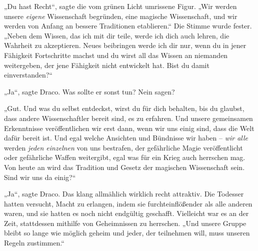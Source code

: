 „Du hast Recht“, sagte die vom grünen Licht umrissene Figur. „Wir werden unsere \emph{eigene} Wissenschaft begründen, eine magische Wissenschaft, und wir werden von Anfang an bessere Traditionen etablieren.“ Die Stimme wurde fester. „Neben dem Wissen, das ich mit dir teile, werde ich dich auch lehren, die Wahrheit zu akzeptieren. Neues beibringen werde ich dir nur, wenn du in jener Fähigkeit Fortschritte machst und du wirst all das Wissen an niemanden weitergeben, der jene Fähigkeit nicht entwickelt hat. Bist du damit einverstanden?“

„Ja“, sagte Draco. Was sollte er sonst tun? Nein sagen?

„Gut. Und was du selbst entdeckst, wirst du für dich behalten, bis du glaubst, dass andere Wissenschaftler bereit sind, es zu erfahren. Und unsere gemeinsamen Erkenntnisse veröffentlichen wir erst dann, wenn wir uns einig sind, dass die Welt dafür bereit ist. Und egal welche Ansichten und Bündnisse wir haben – \emph{wir alle} werden \emph{jeden einzelnen} von uns bestrafen, der gefährliche Magie veröffentlicht oder gefährliche Waffen weitergibt, egal was für ein Krieg auch herrschen mag. Von heute an wird das Tradition und Gesetz der magischen Wissenschaft sein. Sind wir uns da einig?“

„Ja“, sagte Draco. Das klang allmählich wirklich recht attraktiv. Die Todesser hatten versucht, Macht zu erlangen, indem sie furchteinflößender als alle anderen waren, und sie hatten es noch nicht endgültig geschafft. Vielleicht war es an der Zeit, stattdessen mithilfe von Geheimnissen zu herrschen. „Und unsere Gruppe bleibt so lange wie möglich geheim und jeder, der teilnehmen will, muss unseren Regeln zustimmen.“

